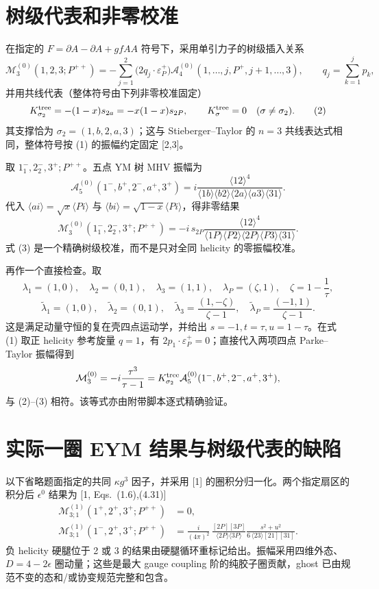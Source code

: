 \documentclass[UTF8,11pt]{ctexart}
\newcommand{\cA}{\mathcal A}
\newcommand{\cM}{\mathcal M}
\newcommand{\e}{\varepsilon}
\newcommand{\eps}{\epsilon}
\begin{document}
\section{树级代表和非零校准}
在指定的 $F=\partial A-\partial A+gfAA$ 符号下，采用单引力子的树级插入关系
\[
\cM^{(0)}_3(1,2,3;P^{++})
=-\sum_{j=1}^{2}\bigl(2q_j\!\cdot\!\e_P^+\bigr)
\cA^{(0)}_4(1,\ldots,j,P^+,j+1,\ldots,3),
\qquad q_j=\sum_{k=1}^{j}p_k,
\tag{1}
\]
并用共线代表（整体符号由下列非零校准固定）
\[
K^{\rm tree}_{\sigma_2}=-(1-x)s_{2a}=-x(1-x)s_{2P},
\qquad K^{\rm tree}_{\sigma}=0\quad(\sigma\ne\sigma_2).
\tag{2}
\]
其支撑恰为 $\sigma_2=(1,b,2,a,3)$；这与 Stieberger--Taylor 的 $n=3$ 共线表达式相同，整体符号按 (1) 的振幅约定固定 [2,3]。

取 $1^-_1,2^-_2,3^+;P^{++}$。五点 YM 树 MHV 振幅为
\[
\cA^{(0)}_5(1^-,b^+,2^-,a^+,3^+)
=i\frac{\langle12\rangle^4}
{\langle1b\rangle\langle b2\rangle\langle2a\rangle\langle a3\rangle\langle31\rangle}.
\]
代入 $\langle a i\rangle=\sqrt{x}\langle P i\rangle$ 与
$\langle b i\rangle=\sqrt{1-x}\langle P i\rangle$，得非零结果
\[
\cM^{(0)}_3(1^-_1,2^-_2,3^+;P^{++})
=-i\,s_{2P}\frac{\langle12\rangle^4}
{\langle1P\rangle\langle P2\rangle\langle2P\rangle\langle P3\rangle\langle31\rangle}.
\tag{3}
\]
式 (3) 是一个精确树级校准，而不是只对全同 helicity 的零振幅校准。

再作一个直接检查。取
\[
\lambda_1=(1,0),\quad\lambda_2=(0,1),\quad\lambda_3=(1,1),\quad
\lambda_P=(\zeta,1),\quad \zeta=1-\frac1\tau,
\]
\[
\tilde\lambda_1=(1,0),\quad\tilde\lambda_2=(0,1),\quad
\tilde\lambda_3=\frac{(1,-\zeta)}{\zeta-1},\quad
\tilde\lambda_P=\frac{(-1,1)}{\zeta-1}.
\]
这是满足动量守恒的复在壳四点运动学，并给出
$s=-1,t=\tau,u=1-\tau$。在式 (1) 取正 helicity 参考旋量 $q=1$，有
$2p_1\cdot\e_P^+=0$；直接代入两项四点 Parke--Taylor 振幅得到
\[
\cM^{(0)}_3=-i\frac{\tau^3}{\tau-1}
=K^{\rm tree}_{\sigma_2}\cA^{(0)}_5(1^-,b^+,2^-,a^+,3^+),
\]
与 (2)--(3) 相符。该等式亦由附带脚本逐式精确验证。

\section{实际一圈 EYM 结果与树级代表的缺陷}
以下省略题面指定的共同 $\kappa g^3$ 因子，并采用 [1] 的圈积分归一化。两个指定扇区的积分后 $\eps^0$ 结果为 [1, Eqs.~(1.6),(4.31)]
\begin{align}
\cM^{(1)}_{3;1}(1^+,2^+,3^+;P^{++})&=0,\tag{4a}\\
\cM^{(1)}_{3;1}(1^-,2^+,3^+;P^{++})
&=\frac{i}{(4\pi)^2}\,
\frac{[2P][3P]}{\langle2P\rangle\langle3P\rangle}
\frac{s^2+u^2}{6\,\langle23\rangle[21][31]}.
\tag{4b}
\end{align}
负 helicity 硬腿位于 2 或 3 的结果由硬腿循环重标记给出。振幅采用四维外态、$D=4-2\eps$ 圈动量；这些是最大 gauge coupling 阶的纯胶子圈贡献，ghost 已由规范不变的态和/或协变规范完整和包含。
\end{document}

